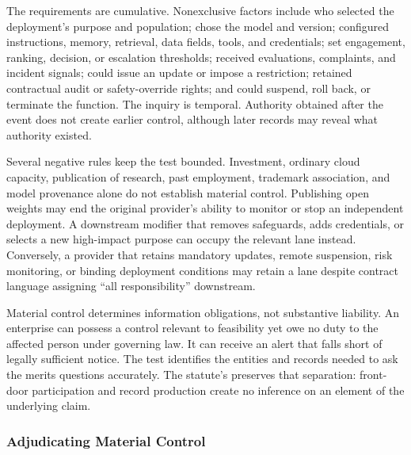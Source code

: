 The requirements are cumulative. Nonexclusive factors include who selected the deployment's purpose and population; chose the model and version; configured instructions, memory, retrieval, data fields, tools, and credentials; set engagement, ranking, decision, or escalation thresholds; received evaluations, complaints, and incident signals; could issue an update or impose a restriction; retained contractual audit or safety-override rights; and could suspend, roll back, or terminate the function. The inquiry is temporal. Authority obtained after the event does not create earlier control, although later records may reveal what authority existed.

Several negative rules keep the test bounded. Investment, ordinary cloud capacity, publication of research, past employment, trademark association, and model provenance alone do not establish material control. Publishing open weights may end the original provider's ability to monitor or stop an independent deployment. A downstream modifier that removes safeguards, adds credentials, or selects a new high-impact purpose can occupy the relevant lane instead. Conversely, a provider that retains mandatory updates, remote suspension, risk monitoring, or binding deployment conditions may retain a lane despite contract language assigning ``all responsibility'' downstream.

Material control determines information obligations, not substantive liability. An enterprise can possess a control relevant to feasibility yet owe no duty to the affected person under governing law. It can receive an alert that falls short of legally sufficient notice. The test identifies the entities and records needed to ask the merits questions accurately. The statute's  preserves that separation: front-door participation and record production create no inference on an element of the underlying claim.

\subsubsection{Adjudicating Material Control}

